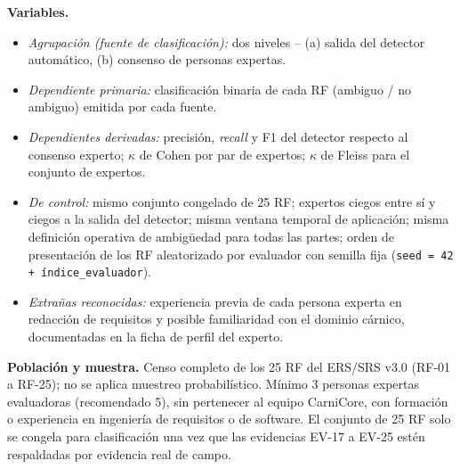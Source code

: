 \documentclass[11pt,a4paper]{article}
\begin{document}
\textbf{Variables.}
\begin{itemize}[nosep]
\item \textit{Agrupación (fuente de clasificación):} dos niveles -- (a) salida del detector automático, (b) consenso de personas expertas.
\item \textit{Dependiente primaria:} clasificación binaria de cada RF (ambiguo / no ambiguo) emitida por cada fuente.
\item \textit{Dependientes derivadas:} precisión, \textit{recall} y F1 del detector respecto al consenso experto; \(\kappa\) de Cohen por par de expertos; \(\kappa\) de Fleiss para el conjunto de expertos.
\item \textit{De control:} mismo conjunto congelado de 25 RF; expertos ciegos entre sí y ciegos a la salida del detector; misma ventana temporal de aplicación; misma definición operativa de ambigüedad para todas las partes; orden de presentación de los RF aleatorizado por evaluador con semilla fija (\texttt{seed = 42 + índice\_evaluador}).
\item \textit{Extrañas reconocidas:} experiencia previa de cada persona experta en redacción de requisitos y posible familiaridad con el dominio cárnico, documentadas en la ficha de perfil del experto.
\end{itemize}

\textbf{Población y muestra.} Censo completo de los 25 RF del ERS/SRS v3.0 (RF-01 a RF-25); no se aplica muestreo probabilístico. Mínimo 3 personas expertas evaluadoras (recomendado 5), sin pertenecer al equipo CarniCore, con formación o experiencia en ingeniería de requisitos o de software. El conjunto de 25 RF solo se congela para clasificación una vez que las evidencias EV-17 a EV-25 estén respaldadas por evidencia real de campo.
\end{document}
